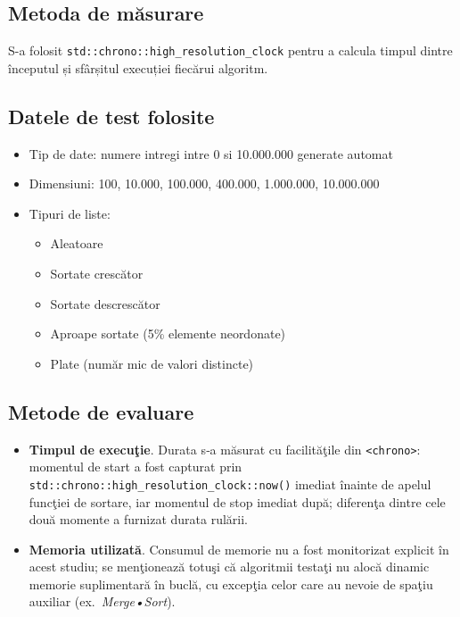 \documentclass{article}
\begin{document}
\subsection{Metoda de măsurare}
S-a folosit \texttt{std::chrono::high\_resolution\_clock} pentru a calcula timpul dintre începutul și sfârșitul execuției fiecărui algoritm.



\subsection{Datele de test folosite}
\begin{itemize}
    \item Tip de date: numere intregi intre 0 si 10.000.000 generate automat
    \item Dimensiuni: {\small 100, 10.000, 100.000, 400.000, 1.000.000, 10.000.000 }
    \item Tipuri de liste:
          \begin{itemize}
              \item Aleatoare
              \item Sortate crescător
              \item Sortate descrescător
              \item Aproape sortate (5\% elemente neordonate)
              \item Plate (număr mic de valori distincte)
          \end{itemize}
\end{itemize}

\subsection{Metode de evaluare}
\begin{itemize}
  \item \textbf{Timpul de execuţie}. Durata s‑a măsurat cu facilităţile din \texttt{<chrono>}: momentul de start a fost capturat prin \texttt{std::chrono::high\_resolution\_clock::now()} imediat înainte de apelul funcţiei de sortare, iar momentul de stop imediat după;  diferenţa dintre cele două momente a furnizat durata rulării.
  \item \textbf{Memoria utilizată}. Consumul de memorie nu a fost monitorizat explicit în acest studiu; se menţionează totuşi că algoritmii testaţi nu alocă dinamic memorie suplimentară în buclă, cu excepţia celor care au nevoie de spaţiu auxiliar (ex.~\textit{Merge•Sort}).
\end{itemize}
\end{document}
